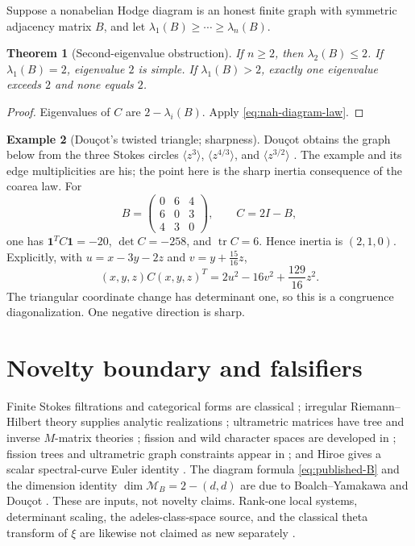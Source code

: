 \documentclass[11pt,a4paper]{amsart}
\theoremstyle{plain}
\newtheorem{theorem}{Theorem}[section]
\theoremstyle{definition}
\newtheorem{example}[theorem]{Example}
\newcommand{\one}{\mathbf 1}
\newcommand{\Mcal}{\mathcal M}
\begin{document}
Suppose a nonabelian Hodge diagram is an honest finite graph with symmetric adjacency matrix $B$,
and let $\lambda_1(B)\geq\cdots\geq\lambda_n(B)$.

\begin{theorem}[Second-eigenvalue obstruction]\label{thm:lambda-two}
If $n\geq2$, then $\lambda_2(B)\leq2$.  If $\lambda_1(B)=2$, eigenvalue $2$ is simple.  If
$\lambda_1(B)>2$, exactly one eigenvalue exceeds $2$ and none equals $2$.
\end{theorem}

\begin{proof}
Eigenvalues of $C$ are $2-\lambda_i(B)$.  Apply \eqref{eq:nah-diagram-law}.
\end{proof}

\begin{example}[Dou\c{c}ot's twisted triangle; sharpness]\label{ex:triangle}
Dou\c{c}ot obtains the graph below from the three Stokes circles
$\langle z^3\rangle$, $\langle z^{4/3}\rangle$, and $\langle z^{3/2}\rangle$
\cite[Proposition~3.3]{Doucot2025}.  The example and its edge multiplicities are his; the point
here is the sharp inertia consequence of the coarea law.  For
\[
 B=\begin{pmatrix}0&6&4\\6&0&3\\4&3&0\end{pmatrix},\qquad C=2I-B,
\]
one has $\one^TC\one=-20$, $\det C=-258$, and $\operatorname{tr}C=6$.  Hence inertia is
$(2,1,0)$.  Explicitly, with
$u=x-3y-2z$ and $v=y+\frac{15}{16}z$,
\[
 (x,y,z)C(x,y,z)^T=2u^2-16v^2+\frac{129}{16}z^2.
\]
The triangular coordinate change has determinant one, so this is a congruence diagonalization.
One negative direction is sharp.
\end{example}

\section{Novelty boundary and falsifiers}\label{sec:novelty}

Finite Stokes filtrations and categorical forms are classical \cite{Sabbah}; irregular
Riemann--Hilbert theory supplies analytic realizations \cite{DKRH}; ultrametric matrices have tree
and inverse $M$-matrix theories \cite{Martinez1994,McDonald1995,Nabben1995}; fission and wild
character spaces are developed in \cite{Boalch2014}; fission trees and ultrametric graph constraints
appear in \cite{Boalch2025,Doucot2025}; and Hiroe gives a scalar spectral-curve Euler identity
\cite{Hiroe2019}.  The diagram formula \eqref{eq:published-B} and the dimension identity
$\dim\Mcal_B=2-(d,d)$ are due to Boalch--Yamakawa and Dou\c{c}ot
\cite{BoalchYamakawa2020,Doucot2021}.  These are inputs, not novelty claims.
Rank-one local systems, determinant scaling, the adeles-class-space source, and the classical
theta transform of $\xi$ are likewise not claimed as new separately
\cite{Connes1999,ConnesConsaniMarcolli2007,Titchmarsh1986}.
\end{document}
